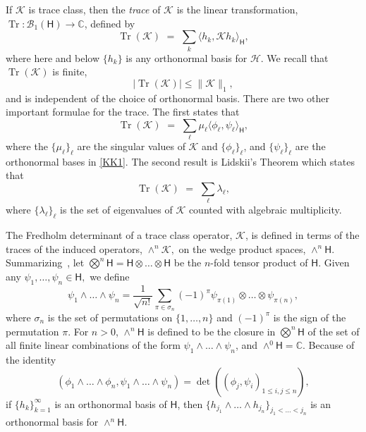 \documentclass{birkjour}
\theoremstyle{definition}
\theoremstyle{remark}
\numberwithin{equation}{section}
\newcommand{\cB}{{\mathcal B}}
\newcommand{\cK}{{\mathcal K}}
\newcommand{\sH}{{\mathsf H}}
\newcommand{\Tr}{{\operatorname{Tr}}}
\begin{document}
If $\mathcal{K}$ is trace class, then the \emph{trace} of $\cK$ 
is the linear transformation, 
$\Tr: \cB_1(\sH) \rightarrow \mathbb{C}$,  defined by
\begin{equation}\label{eq:traceprod}
\operatorname{Tr}(\mathcal K) \,\,=\,\, \sum_k
\langle h_k, \mathcal K h_k \rangle_\sH,
\end{equation}
where here and below $\{h_k\}$ is any orthonormal basis for $\mathcal H$. 
We recall that $\operatorname{Tr}(\mathcal{K})$ is finite,
\begin{equation}
    |\operatorname{Tr}(\mathcal{K})| \leq \|\mathcal{K}\|_1,
\end{equation}
and  is independent of the choice of orthonormal basis.
There are two other important formulae for the trace. The first states
that 
\begin{equation}\label{eq:TraceByEval}
\operatorname{Tr}(\mathcal K) 
 \,\,=\,\, \sum\limits_\ell \mu_\ell \langle \phi_\ell, \psi_\ell\rangle_\sH,
 \end{equation}
where the $\{\mu_\ell\}_\ell$ are the singular values of $\cK$ and 
 $\{\phi_\ell\}_\ell$, and $\{\psi_\ell\}_\ell$ are the 
 orthonormal bases in \eqref{KK1}. 
The second result is Lidskii's Theorem which states that
\begin{equation}\label{eq:lidskii}
\operatorname{Tr}(\mathcal K) 
 \,\,=\,\,   \sum\limits_\ell \lambda_\ell,
\end{equation}
where $\{\lambda_\ell\}_\ell$ is the set of eigenvalues of $\cK$ counted
with algebraic multiplicity. 


The Fredholm determinant of a trace class operator, $\mathcal{K}$, is defined in terms of the traces of the induced operators, ${\wedge}^n\mathcal{K},$ on the wedge product spaces, ${\wedge}^n \sH$. Summarizing~\cite[Section 1.5]{Simon},
 let $\bigotimes^n \sH = \sH \otimes \dots \otimes \sH$ be the $n$-fold tensor product of $\sH.$
Given any $\psi_1, \dots, \psi_n \in \sH,$ we define
\begin{equation}\label{psiwedge}
    \psi_1 \wedge \dots \wedge \psi_n = \frac{1}{\sqrt{n!}} \sum_{\pi \in \sigma_n} (-1)^{\pi} \psi_{\pi(1)} \otimes \dots \otimes \psi_{\pi (n)},
\end{equation}
where $\sigma_n$ is the set of permutations on $\{1,\dots,n\}$ and $(-1)^{\pi}$ is the sign of the permutation $\pi.$ For $n>0$, 
$\wedge^n \sH$ is defined to be
 the closure in $\bigotimes^n \sH$ of the set of  all finite linear combinations of the form $\psi_1 \wedge \dots \wedge \psi_n$,  and $\wedge^0 \sH = \mathbb{C}$. 
Because of the identity
\begin{equation}\label{eq:detfromwedge}
    (\phi_1 \wedge \dots \wedge \phi_n, \psi_1 \wedge \dots \wedge \psi_n) = \det((\phi_j,\psi_i)_{1 \leq i,j \leq n}),
\end{equation}
if $\{h_k\}_{k=1}^{\infty}$ is an orthonormal basis of $\sH$, then 
$\{h_{j_1} \wedge \dots \wedge h_{j_n}\}_{j_1 < \dots < j_n}$ is an orthonormal basis for $\wedge^n \sH$.
\end{document}
